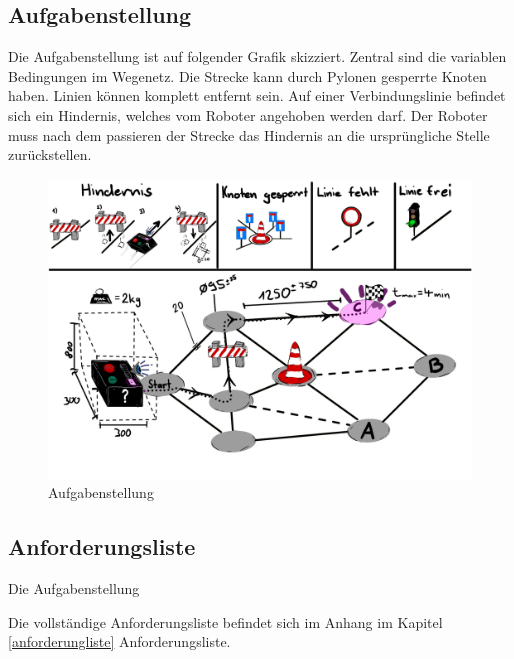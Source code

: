 \subsection{Aufgabenstellung}

Die Aufgabenstellung ist auf folgender Grafik skizziert. Zentral sind die variablen Bedingungen im Wegenetz. Die Strecke kann durch Pylonen gesperrte Knoten haben. Linien können komplett entfernt sein.  Auf einer Verbindungslinie befindet sich ein Hindernis, welches vom Roboter angehoben werden darf. Der Roboter muss nach dem passieren der Strecke das Hindernis an die ursprüngliche Stelle zurückstellen.  

\begin{figure}[H]
\centering
\includegraphics[width=\textwidth]{img/Skizze_Aufgabenstellung_v4.2.png}
\caption{Aufgabenstellung}
\label{fig:aufgebanstellung}
\end{figure}

\subsection{Anforderungsliste}

Die Aufgabenstellung

Die vollständige Anforderungsliste befindet sich im Anhang im Kapitel \ref{anforderungliste} Anforderungsliste.